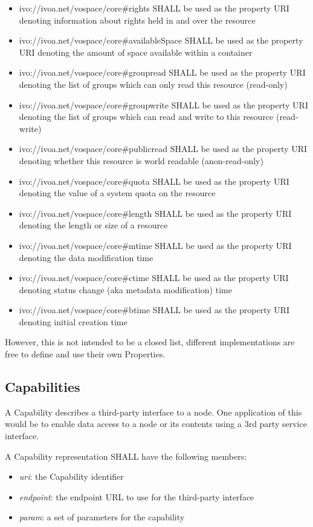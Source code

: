 \documentclass[11pt,a4paper]{ivoa}
\begin{document}
\begin{itemize}
    \item ivo://ivoa.net/vospace/core\#rights SHALL be used as the property URI denoting information about rights held in and over the resource
    \item ivo://ivoa.net/vospace/core\#availableSpace SHALL be used as the property URI denoting the amount of space available within a container
    \item ivo://ivoa.net/vospace/core\#groupread SHALL be used as the property URI denoting the list of groups which can only read this resource (read-only)
    \item ivo://ivoa.net/vospace/core\#groupwrite SHALL be used as the property URI denoting the list of groups which can read and write to this resource (read-write)
    \item ivo://ivoa.net/vospace/core\#publicread SHALL be used as the property URI denoting whether this resource is world readable (anon-read-only)
    \item ivo://ivoa.net/vospace/core\#quota SHALL be used as the property URI denoting the value of a system quota on the resource
    \item ivo://ivoa.net/vospace/core\#length SHALL be used as the property URI denoting the length or size of a resource
    \item ivo://ivoa.net/vospace/core\#mtime SHALL be used as the property URI denoting the data modification time
    \item ivo://ivoa.net/vospace/core\#ctime SHALL be used as the property URI denoting status change (aka metadata modification) time
    \item ivo://ivoa.net/vospace/core\#btime SHALL be used as the property URI denoting initial creation time
\end{itemize}

However, this is not intended to be a closed list, different implementations are free to define and use their own Properties.

\subsection{Capabilities}
\label{subsec:capabilities}
A Capability describes a third-party interface to a node. One application of this would be to enable data access to a node or its contents using a 3rd party service interface.

A Capability representation SHALL have the following members:

\begin{itemize}
    \item \emph{uri}: the Capability identifier
    \item \emph{endpoint}: the endpoint URL to use for the third-party interface
    \item \emph{param}: a set of parameters for the capability
\end{itemize}
\end{document}
